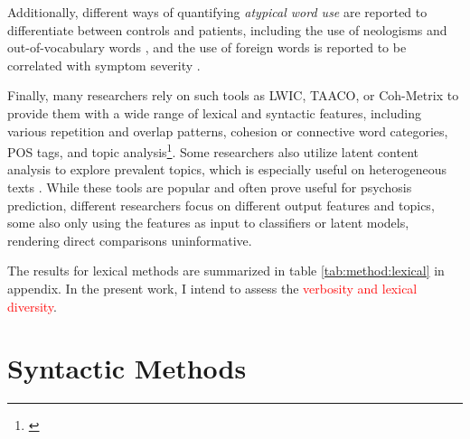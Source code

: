 Additionally, different ways of quantifying \textit{atypical word use} are reported to differentiate between controls and patients, including the use of neologisms \citep{just2019coherence, just2020modeling} and out-of-vocabulary words \citep{just2020modeling}, and the use of foreign words is reported to be correlated with symptom severity \citep{jeong2023exploring}.

Finally, many researchers rely on such tools as LWIC, TAACO, or Coh-Metrix to provide them with a wide range of lexical and syntactic features, including various repetition and overlap patterns, cohesion or connective word categories, POS tags, and topic analysis\footnote{\cite{mitchell2015quantifying, gupta2018automated, vail2018toward, willits2018evidence, just2020modeling, mota2022happy, girard2022computational, liang2022widespread, minor2023automated}}. Some researchers also utilize latent content analysis to explore prevalent topics, which is especially useful on heterogeneous texts \citep{mitchell2015quantifying, rezaii2019machine}. While these tools are popular and often prove useful for psychosis prediction, different researchers focus on different output features and topics, some also only using the features as input to classifiers or latent models, rendering direct comparisons uninformative. 

The results for lexical methods are summarized in table \ref{tab:method:lexical} in appendix. In the present work, I intend to assess the \textcolor{red}{verbosity and lexical diversity}.  


\section{Syntactic Methods}
\label{sec:review:syntactic}

